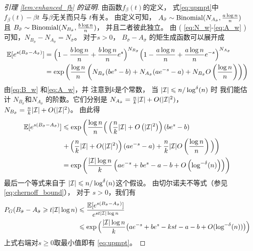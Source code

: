 \begin{proof}[引理 \ref{lem:enhanced_fb} 的证明]
  由函数$f_{\beta}(t)$的定义，
  式\eqref{eq:upmpt}中
  $f_{\beta}(t) - \beta t$ 与$\beta$无关而只与
  $t$有关。
	由定义可知，
  $A_{\bar{\sigma}}\sim \operatorname{Binomial}(N_{A_{\bar{\sigma}}},\frac{a\log n}{n})$
  且
	$B_{\bar{\sigma}}\sim\operatorname{Binomial}(N_{B_{\bar{\sigma}}},\frac{b\log n}{n})$，
  并且二者彼此独立。
  由 ( \ref{eq:N_w}-\ref{eq:A_w} )可知，$N_{B_{\bar{\sigma}}} - N_{A_{\bar{\sigma}}}
  = N_{\bar{\sigma}}$。
  对于$s>0$，
  $B_{\bar{\sigma}}-A_{\bar{\sigma}}$ 的矩生成函数可以展开成
	\begin{align}
	 \mathbb{E}[e^{s(B_{\bar{\sigma}}-A_{\bar{\sigma}})}] 
	& =\Big(1-\frac{b\log n}{n}+\frac{b\log n}{n} e^s \Big)^{N_{B_{\bar{\sigma}}}}
	\Big(1-\frac{a\log n}{n}+\frac{a\log n}{n} e^{-s} \Big)^{N_{A_{\bar{\sigma}}}}  \notag\\
	& = \exp\left(\frac{\log n}{n}\left(N_{B_{\bar{\sigma}}}
  (be^s - b) + N_{A_{\bar{\sigma}}}(ae^{-s}-a) + N_{B_{\bar{\sigma}}}
  O \left(\frac{\log n}{n} \right) \right) \right)
  \label{eq:exp_s_B_A_sigma}
	\end{align}
	由\eqref{eq:B_w}
  和\eqref{eq:A_w}，并
  注意到$k$是个常数，
  当
  $|\mathcal{I}| \leqslant n/\log^{\delta}(n)$ 时
	我们能估计
  $N_{B_{\bar{\sigma}}}$和$N_{A_{\bar{\sigma}}}$
  的阶数。它们分别是
  $N_{A_{\bar{\sigma}}} = \frac{n}{k}|\mathcal{I}| + O(|\mathcal{I}|^2)$，
	 $N_{B_{\bar{\sigma}}} = \frac{n}{k}|\mathcal{I}| + O(|\mathcal{I}|^2)$。
   由此得
	\begin{align*}
	\mathbb{E}[e^{s(B_{\bar{\sigma}}-A_{\bar{\sigma}})}]
  & \leqslant
	\exp\left(\frac{\log n}{n}\Big( 
    \left(\frac{n}{k}|\mathcal{I}| + O\left(|\mathcal{I}|^2\right)\right)
    (be^s - b) 
    \right.\\
  & \left. \relax 
  + \left(\frac{n}{k} |\mathcal{I}| + O(|\mathcal{I}|^2)\right)(ae^{-s}-a) + \frac{n}{k}|\mathcal{I}|O\left(\frac{\log n}{n} \right) \Big)\right)\\
	&=
   \exp\left(\frac{|\mathcal{I}| \log n}{k}
   \left(a e^{-s}+b e^s-a-b +
	O \left(\log^{-\delta}(n) \right) \right) \right)
	\end{align*}
	最后一个等式来自于
  $ |\mathcal{I}| \leqslant n/\log^{\delta}(n)$这个假设。
	由切尔诺夫不等式（参见 \eqref{eq:chernoff_bound}），
  对于 $s>0$，我们有
	\begin{align*} 
	P_G(B_{\bar{\sigma}}-A_{\bar{\sigma}}\geqslant t |\mathcal{I}| \log n)
  & \leqslant
	\frac{\mathbb{E}[e^{s(B_{\bar{\sigma}}-A_{\bar{\sigma}})}]}{e^{st |\mathcal{I}|  \log n}}  \\
  &\leqslant \exp\Big(\frac{|\mathcal{I}|\log n}{k} \big(a e^{-s}+b e^s -kst -a-b
	+ O(\log^{-\delta}(n)) \big)\Big) 
	\end{align*}
	上式右端对$s\geq 0$取最小值即有
  \eqref{eq:upmpt}。  
	\end{proof}

